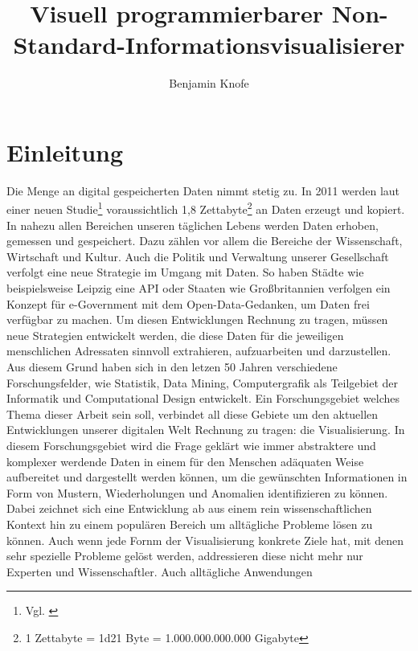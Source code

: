 \documentclass[a4paper, 12pt, DIVcalc, onepage, pdftex, headsepline, footsepline]{scrreprt}
\begin{document}
\title{Visuell programmierbarer Non-Standard-Informationsvisualisierer}
\author{Benjamin Knofe}
\subject{Diplomarbeit}
\publishers{Hochschule für Technik, Wirtschaft und Kultur Leipzig}
\dedication{Dank an \\ Pyry Jahkola, Philip Whitfield}
\maketitle
\tableofcontents

\chapter{Einleitung}
\label{cha:Einleitung}
Die Menge an digital gespeicherten Daten nimmt stetig zu. In 2011 werden laut einer neuen
Studie\footnote{Vgl. \citep{EMC}} voraussichtlich 1,8 Zettabyte\footnote{1 Zettabyte = \num{1d21}
Byte = 1.000.000.000.000 Gigabyte} an Daten erzeugt und kopiert. In nahezu allen Bereichen unseren
täglichen Lebens werden Daten erhoben, gemessen und gespeichert. Dazu zählen vor allem die Bereiche
der Wissenschaft, Wirtschaft und Kultur. Auch die Politik und Verwaltung unserer Gesellschaft
verfolgt eine neue Strategie im Umgang mit Daten. So haben Städte wie beispielsweise Leipzig eine 
API oder Staaten wie Großbritannien verfolgen ein Konzept für e-Government mit dem
Open-Data-Gedanken, um Daten frei verfügbar zu machen. Um diesen Entwicklungen Rechnung zu tragen,
müssen neue Strategien entwickelt werden, die diese Daten für die jeweiligen menschlichen Adressaten
sinnvoll extrahieren, aufzuarbeiten und darzustellen. Aus diesem Grund haben sich in den letzen 50
Jahren verschiedene Forschungsfelder, wie Statistik, Data Mining, Computergrafik als Teilgebiet der
Informatik und Computational Design entwickelt. Ein Forschungsgebiet welches Thema dieser Arbeit
sein soll, verbindet all diese Gebiete um den aktuellen Entwicklungen unserer digitalen Welt
Rechnung zu tragen: die Visualisierung. In diesem Forschungsgebiet wird die Frage geklärt wie immer
abstraktere und komplexer werdende Daten in einem für den Menschen adäquaten Weise aufbereitet und
dargestellt werden können, um die gewünschten Informationen in Form von Mustern, Wiederholungen und
Anomalien identifizieren zu können. Dabei zeichnet sich eine Entwicklung ab aus einem rein
wissenschaftlichen Kontext hin zu einem populären Bereich um alltägliche Probleme lösen zu können.
Auch wenn jede Fornm der Visualisierung konkrete Ziele hat, mit denen sehr spezielle Probleme gelöst
werden, addressieren diese nicht mehr nur Experten und Wissenschaftler. Auch alltägliche Anwendungen
\end{document}

